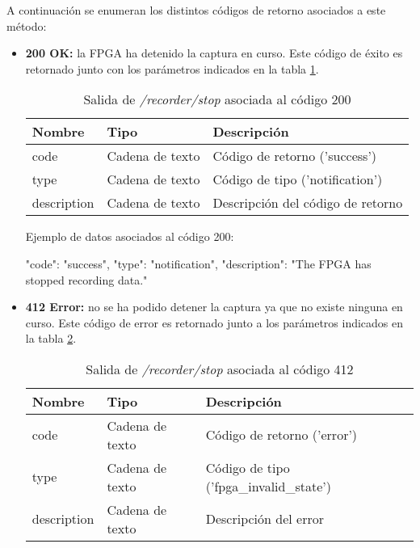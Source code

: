 A continuación se enumeran los distintos códigos de retorno asociados a este método:
\begin{itemize}

\item{\textbf{200 OK:} la \gls{FPGA} ha detenido la captura en curso. Este código de éxito es retornado junto con los parámetros indicados en la tabla \ref{extra:api:recorderstop:ok}.
\begin{table}[H]
\centering
\begin{tabular}{|l|l|l|}
\hline
\rowcolor[HTML]{F5F5F5}
\textbf{Nombre}  & \textbf{Tipo}   & \textbf{Descripción}              \\ \hline
code             & Cadena de texto & Código de retorno ('success')     \\ \hline
type             & Cadena de texto & Código de tipo ('notification')   \\ \hline
description      & Cadena de texto & Descripción del código de retorno \\ \hline
\end{tabular}
\caption{Salida de \textit{/recorder/stop} asociada al código 200}
\label{extra:api:recorderstop:ok}
\end{table}
\begin{minipage}{\textwidth}
Ejemplo de datos asociados al código 200:

\begin{code}[language=json]
{
  "code": "success",
  "type": "notification",
  "description": "The FPGA has stopped recording data."
}
\end{code}
\end{minipage}
}

\item{\textbf{412 Error:} no se ha podido detener la captura ya que no existe ninguna en curso. Este código de error es retornado junto a los parámetros indicados en la tabla \ref{extra:api:recorderstop:error}.
\begin{table}[H]
\centering
\begin{tabular}{|l|l|l|}
\hline
\rowcolor[HTML]{F5F5F5}
\textbf{Nombre}  & \textbf{Tipo}   & \textbf{Descripción}                    \\ \hline
code             & Cadena de texto & Código de retorno ('error')             \\ \hline
type             & Cadena de texto & Código de tipo ('fpga\_invalid\_state') \\ \hline
description      & Cadena de texto & Descripción del error                   \\ \hline
\end{tabular}
\caption{Salida de \textit{/recorder/stop} asociada al código 412}
\label{extra:api:recorderstop:error}
\end{table}

}
\end{itemize}
